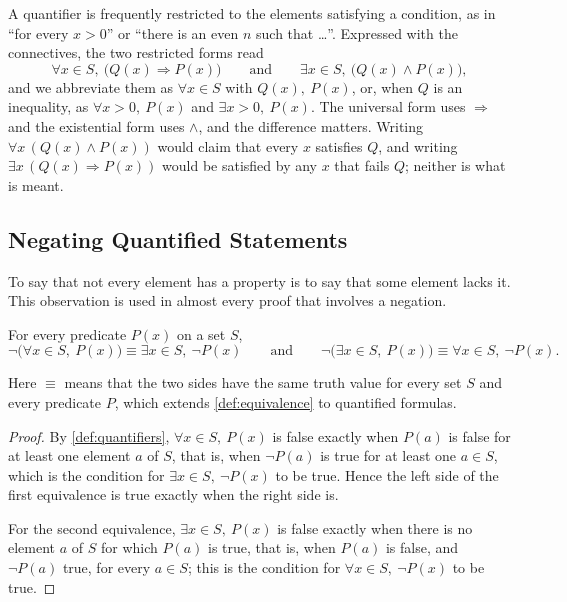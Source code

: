 A quantifier is frequently restricted to the elements satisfying a condition, as in ``for every $x>0$'' or ``there is an even $n$ such that \ldots''. Expressed with the connectives, the two restricted forms read
\begin{equation}
\forall x\in S,\ \bigl(Q(x)\Rightarrow P(x)\bigr)
\qquad\text{and}\qquad
\exists x\in S,\ \bigl(Q(x)\wedge P(x)\bigr),
\label{eq:restricted}
\end{equation}
and we abbreviate them as $\forall x\in S$ with $Q(x),\ P(x)$, or, when $Q$ is an inequality, as $\forall x>0,\ P(x)$ and $\exists x>0,\ P(x)$. The universal form uses $\Rightarrow$ and the existential form uses $\wedge$, and the difference matters. Writing $\forall x\,(Q(x)\wedge P(x))$ would claim that every $x$ satisfies $Q$, and writing $\exists x\,(Q(x)\Rightarrow P(x))$ would be satisfied by any $x$ that fails $Q$; neither is what is meant.

\subsection{Negating Quantified Statements}

To say that not every element has a property is to say that some element lacks it. This observation is used in almost every proof that involves a negation.

\begin{theorem}
\label{thm:quantifier-negation}
For every predicate $P(x)$ on a set $S$,
\[
\neg\bigl(\forall x\in S,\ P(x)\bigr)\equiv\exists x\in S,\ \neg P(x)
\qquad\text{and}\qquad
\neg\bigl(\exists x\in S,\ P(x)\bigr)\equiv\forall x\in S,\ \neg P(x).
\]
\end{theorem}

Here $\equiv$ means that the two sides have the same truth value for every set $S$ and every predicate $P$, which extends \cref{def:equivalence} to quantified formulas.

\begin{proof}
By \cref{def:quantifiers}, $\forall x\in S,\ P(x)$ is false exactly when $P(a)$ is false for at least one element $a$ of $S$, that is, when $\neg P(a)$ is true for at least one $a\in S$, which is the condition for $\exists x\in S,\ \neg P(x)$ to be true. Hence the left side of the first equivalence is true exactly when the right side is.

For the second equivalence, $\exists x\in S,\ P(x)$ is false exactly when there is no element $a$ of $S$ for which $P(a)$ is true, that is, when $P(a)$ is false, and $\neg P(a)$ true, for every $a\in S$; this is the condition for $\forall x\in S,\ \neg P(x)$ to be true.
\end{proof}

